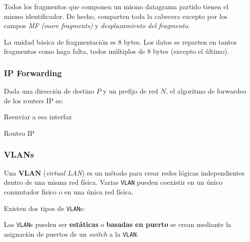 \documentclass[]{article}
\begin{document}
Todos los fragmentos que componen un mismo datagrama partido tienen el mismo identificador. De hecho, comparten toda la cabecera excepto por los campos \emph{MF (more fragments)} y \emph{desplazamiento del fragmento}.

La unidad básica de fragmentación es 8 bytes. Los datos se reparten en tantos fragmentos como haga falta, todos múltiplos de 8 bytes (excepto el último).


\subsubsection{IP Forwarding}
Dada una dirección de destino $P$ y un prefijo de red $N$, el algoritmo de forwardeo de los routers IP es:

\begin{algorithm}[H]
  {
    Reenviar a esa interfaz
 } {
 }
 \caption{Routeo IP}
\end{algorithm}

\subsubsection{VLANs}


Una \textbf{VLAN} (\emph{virtual LAN}) es un método para crear redes lógicas independientes dentro de una misma red física. Varias \texttt{VLAN} pueden coexistir en un único conmutador físico o en una única red física.

Existen dos tipos de \texttt{VLAN}s:

Las \texttt{VLAN}s pueden ser \textbf{estáticas} o \textbf{basadas en puerto} se crean mediante la asignación de puertos de un \emph{switch} a la \texttt{VLAN}.
\end{document}

